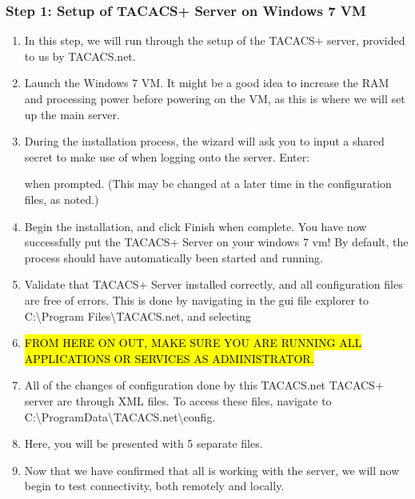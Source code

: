 \documentclass[main.tex]{subfiles}
\begin{document}
\subsubsection{Step 1: Setup of TACACS+ Server on Windows 7 VM}
\begin{enumerate}[noitemsep,label=$\bullet$,leftmargin=12mm,labelsep=0.5cm]

\item In this step, we will run through the setup of the TACACS+ server, provided to us by TACACS.net.

\item Launch the Windows 7 VM. It might be a good idea to increase the RAM and processing power before powering on the VM, as this is where we will set up the main server.

\item During the installation process, the wizard will ask you to input a shared secret to make use of when logging onto the server. Enter:

when prompted. (This may be changed at a later time in the configuration files, as noted.)

\item Begin the installation, and click Finish when complete. You have now successfully put the TACACS+ Server on your windows 7 vm! By default, the process should have automatically been started and running.

\item Validate that TACACS+ Server installed correctly, and all configuration files are free of errors. This is done by navigating in the gui file explorer to C:\textbackslash Program Files\textbackslash TACACS.net, and selecting 

\item \hl{FROM HERE ON OUT, MAKE SURE YOU ARE RUNNING ALL APPLICATIONS OR SERVICES AS ADMINISTRATOR.}
\vspace{3mm}
\item All of the changes of configuration done by this TACACS.net TACACS+ server are through XML files. To access these files, navigate to C:\textbackslash ProgramData\textbackslash TACACS.net\textbackslash config. 
\item Here, you will be presented with 5 separate files. 


\item Now that we have confirmed that all is working with the server, we will now begin to test connectivity, both remotely and locally.

\end{enumerate}
\end{document}
